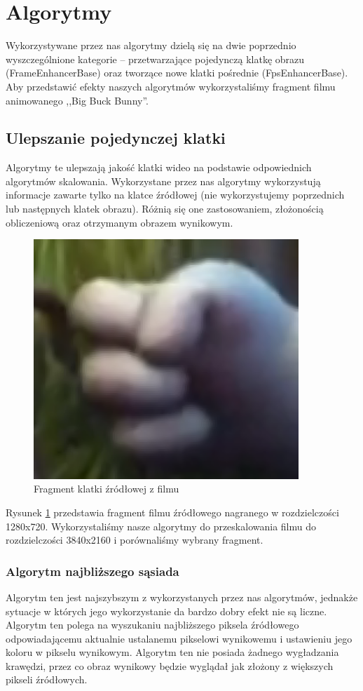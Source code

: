 \documentclass[twoside]{projektInzynierskiMS}
\begin{document}
\section{Algorytmy}
Wykorzystywane przez nas algorytmy dzielą się na dwie poprzednio wyszczególnione kategorie -- przetwarzające pojedynczą klatkę obrazu (FrameEnhancerBase) oraz tworzące nowe klatki pośrednie (FpsEnhancerBase). Aby przedstawić efekty naszych algorytmów wykorzystaliśmy fragment filmu animowanego ,,Big Buck Bunny''.

\subsection{Ulepszanie pojedynczej klatki}
Algorytmy te ulepszają jakość klatki wideo na podstawie odpowiednich algorytmów skalowania. Wykorzystane przez nas algorytmy wykorzystują informacje zawarte tylko na klatce źródłowej (nie wykorzystujemy poprzednich lub następnych klatek obrazu). Różnią się one zastosowaniem, złożonością obliczeniową oraz otrzymanym obrazem wynikowym.
\begin{figure}[h]
\centering
\includegraphics[width=10cm]{HandOrginal.png}
\caption{Fragment klatki źródłowej z filmu}
\label{fig:handOrginal}
\end{figure}

Rysunek \ref{fig:handOrginal} przedstawia fragment filmu źródłowego nagranego w rozdzielczości 1280x720. Wykorzystaliśmy nasze algorytmy do przeskalowania filmu do rozdzielczości 3840x2160 i porównaliśmy wybrany fragment.

\subsubsection{Algorytm najbliższego sąsiada}
Algorytm ten jest najszybszym z wykorzystanych przez nas algorytmów, jednakże sytuacje w których jego wykorzystanie da bardzo dobry efekt nie są liczne. Algorytm ten polega na wyszukaniu najbliższego piksela źródłowego odpowiadającemu aktualnie ustalanemu pikselowi wynikowemu i ustawieniu jego koloru w pikselu wynikowym. Algorytm ten nie posiada żadnego wygładzania krawędzi, przez co obraz wynikowy będzie wyglądał jak złożony z większych pikseli źródłowych. 
\end{document}
